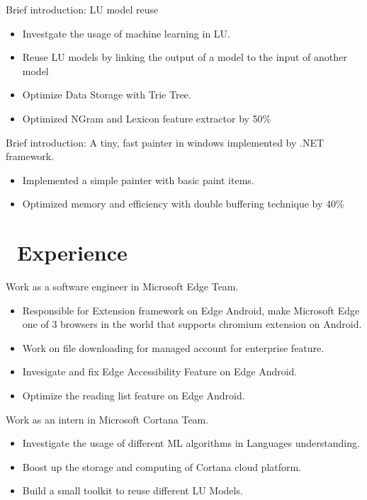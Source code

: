 \documentclass{resume}
\begin{document}
Brief introduction: LU model reuse
\begin{itemize}
	\item Investgate the usage of machine learning in LU.
  \item Reuse LU models by linking the output of a model to the input of another model
	\item Optimize Data Storage with Trie Tree.
  \item Optimized NGram and Lexicon feature extractor by 50\%
\end{itemize}

Brief introduction: A tiny, fast painter in windows implemented by .NET framework.
\begin{itemize}
  \item Implemented a simple painter with basic paint items.
  \item Optimized memory and efficiency with double buffering technique by 40\%
\end{itemize}

\section{\faUsers\ Experience}

Work as a software engineer in Microsoft Edge Team.
\begin{itemize}
    \item Responsible for Extension framework on Edge Android, make Microsoft Edge one of 3 browsers in the world that supports chromium extension on Android.
    \item Work on file downloading for managed account for enterprise feature.
    \item Invesigate and fix Edge Accessibility Feature on Edge Android.
    \item Optimize the reading list feature on Edge Android.
\end{itemize}

Work as an intern in Microsoft Cortana Team.
\begin{itemize}
    \item Investigate the usage of different ML algorithms in Languages understanding.
    \item Boost up the storage and computing of Cortana cloud platform.
    \item Build a small toolkit to reuse different LU Models.
\end{itemize}
\end{document}
